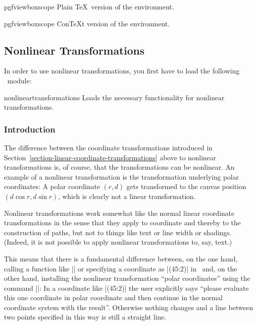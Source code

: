 \begin{plainenvironment}{{pgfviewboxscope}}
    Plain \TeX\ version of the environment.
\end{plainenvironment}

\begin{contextenvironment}{{pgfviewboxscope}}
    Con\TeX t version of the environment.
\end{contextenvironment}


\subsection{Nonlinear Transformations}
\label{section-nonlinear-transformations}

In order to use nonlinear transformations, you first have to load the following
\pgfname\ module:

\begin{pgfmodule}{nonlineartransformations}
    Loads the necessary functionality for nonlinear transformations.
\end{pgfmodule}


\subsubsection{Introduction}

The difference between the coordinate transformations introduced in
Section~\ref{section-linear-coordinate-transformations} above to nonlinear
transformations is, of course, that the transformations can be nonlinear. An
example of a nonlinear transformation is the transformation underlying polar
coordinates: A polar coordinate $(r,d)$ gets transformed to the canvas position
$(d\cos r,d\sin r)$, which is clearly not a linear transformation.

Nonlinear transformations work somewhat like the normal linear coordinate
transformations in the sense that they apply to coordinate and thereby to the
construction of paths, but not to things like text or line width or shadings.
(Indeed, it is not possible to apply nonlinear transformations to, say, text.)

This means that there is a fundamental difference between, on the one hand,
calling a function like |\pgfpointpolar| or specifying a coordinate as |(45:2)|
in \tikzname\ and, on the other hand, installing the nonlinear transformation
``polar coordinates'' using the command |\pgftransformnonlinear|: In a
coordinate like |(45:2)| the user explicitly says ``please evaluate this one
coordinate in polar coordinate and then continue in the normal coordinate
system with the result''. Otherwise nothing changes and a line between two
points specified in this way is still a straight line.


